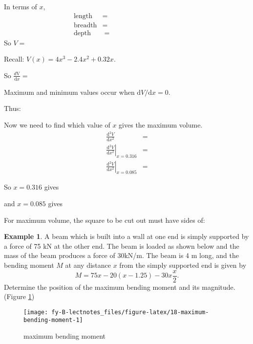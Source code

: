 \documentclass[
  11pt,
  oneside]{book}
\newcommand{\slide}{}
\theoremstyle{definition}
\theoremstyle{definition}
\newtheorem{example}{Example}[chapter]
\theoremstyle{definition}
\theoremstyle{definition}
\theoremstyle{remark}
\begin{document}
\begin{slidesonly}

In terms of \(x\),
\begin{align*}
\text{length} &=\\
\text{breadth} &=\\
\text{depth} &=\phantom{aklsdhflakjshdfklasdf}
\end{align*}
So \(V=\)

\slide

Recall: \(V(x)=4x^3 - 2.4x^2 + 0.32x\).

So \(\frac{d\mathrm{V}}{\mathrm{d} x} =\)

Maximum and minimum values occur when \(\mathrm{d}V/\mathrm{d}x  = 0\).

Thus:

\slide

Now we need to find which value of \(x\) gives the maximum volume.
\begin{align*}
\frac{\mathrm{d}^2 V}{\mathrm{d} x^2} &= \\
\left.\frac{\mathrm{d}^2 V}{\mathrm{d} x^2}\right\vert_{x=0.316} &=\\
\left.\frac{\mathrm{d}^2 V}{\mathrm{d} x^2}\right\vert_{x=0.085} &=
\end{align*}

So \(x=0.316\) gives

and \(x=0.085\) gives

For maximum volume, the square to be cut out must have sides of:

\slide

\end{slidesonly}

\begin{example}
A beam which is built into a wall at one end is simply supported by a force of 75 kN at the other end. The beam is loaded as shown below and the mass of the beam produces a force of 30kN/m. The beam is 4 m long, and the bending moment \(M\) at any distance \(x\) from the simply supported end is given by
\[
M = 75x-20(x-1.25)-30x\frac{x}{2}.
\]
Determine the position of the maximum bending moment and its magnitude. (Figure \ref{fig:18-maximum-bending-moment})
\end{example}

\begin{figure}

{\centering \texttt{[image: fy-B-lectnotes\_files/figure-latex/18-maximum-bending-moment-1]} 

}

\caption{maximum bending moment}\label{fig:18-maximum-bending-moment}
\end{figure}
\slide
\end{document}
